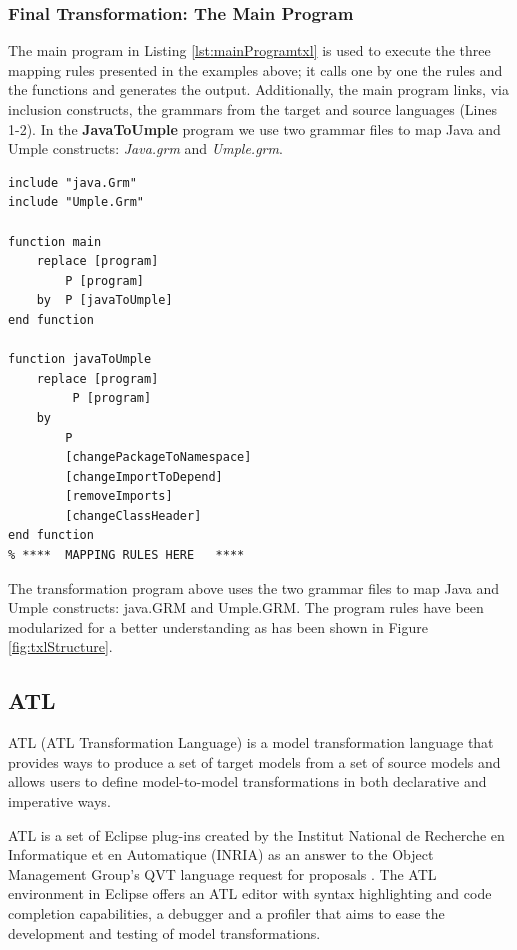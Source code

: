 \subsubsection{Final Transformation: The Main Program}

The main program in Listing \ref{lst:mainProgramtxl} is used to execute the three mapping rules presented in the examples above; it calls one by one the rules and the functions and generates the output. Additionally, the main program links, via inclusion constructs, the grammars from the target and source languages (Lines 1-2). In the \textbf{JavaToUmple} program we use two grammar files to map Java and Umple constructs: \textit{Java.grm} and\textit{ Umple.grm}.

\begin{lstlisting}[style=umplePlain, label=lst:mainProgramtxl, caption=The ATL main program - JavaToUmple.Txl] 
include "java.Grm" 
include "Umple.Grm" 

function main    
    replace [program]
        P [program]     
    by 	P [javaToUmple]
end function 

function javaToUmple   
    replace [program] 
         P [program]     
    by 
        P 
        [changePackageToNamespace] 
        [changeImportToDepend] 
        [removeImports] 
        [changeClassHeader]
end function 
% ****	MAPPING RULES HERE   ****
\end{lstlisting}

The transformation program above uses the two grammar files to map Java and Umple constructs:  java.GRM and Umple.GRM. The program rules have been modularized for a better understanding as has been shown in Figure \ref{fig:txlStructure}.

\subsection{ATL}

ATL (ATL Transformation Language) \cite{atl} is a model transformation language that provides ways to produce a set of target models from a set of source models and allows users to define model-to-model transformations in both declarative and imperative ways.

ATL is a set of Eclipse plug-ins created by the Institut National de Recherche en Informatique et en Automatique (INRIA) as an answer to the Object Management Group's QVT language request for proposals \cite{atl}.  The ATL environment in Eclipse offers an ATL editor with syntax highlighting and code completion capabilities, a debugger and a profiler that aims to ease the development and testing of model transformations.

